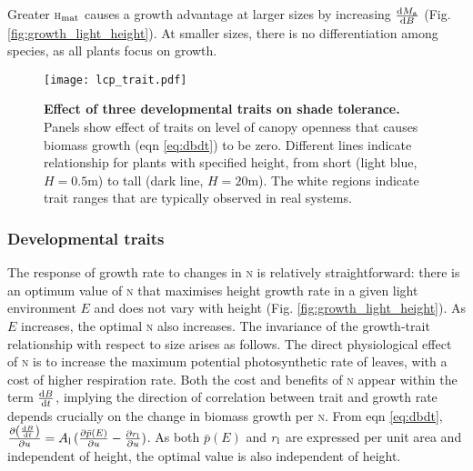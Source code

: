 \documentclass[9pt,twocolumn,twoside,lineno]{pnas-new}
\newcommand{\hmat}{\textsc{h}$_{\rm mat}$}
\newcommand{\nitrogen}{\textsc{n}}
\begin{document}
Greater {\hmat} causes a growth advantage at larger sizes by increasing $\frac{{\rm d}M_{\rm a}}{{\rm d}B}$ (Fig. \ref{fig:growth_light_height}). At smaller sizes, there is no differentiation among species, as all plants focus on growth.

\begin{SCfigure*}[\sidecaptionrelwidth][b]
\centering
\texttt{[image: lcp\_trait.pdf]}
\caption{\textbf{Effect of three developmental traits on shade tolerance.}
Panels show effect of traits on level of canopy openness that causes biomass growth (eqn \ref{eq:dbdt}) to be zero. Different lines indicate relationship for plants with specified height, from short (light blue,  $H=0.5$m) to tall (dark line, $H=20$m). The white regions indicate trait ranges that are typically observed in real systems.
\label{fig:wplcp}}
\end{SCfigure*}

\subsubsection*{Developmental traits}  The response of growth rate to changes in {\nitrogen} is relatively straightforward: there is an optimum value of {\nitrogen} that maximises height growth rate in a given light environment $E$ and does not vary with height (Fig. \ref{fig:growth_light_height}). As $E$ increases, the optimal {\nitrogen} also increases. The invariance of the growth-trait relationship with respect to size arises as follows. The direct physiological effect of {\nitrogen} is to increase the maximum potential photosynthetic rate of leaves, with a cost of higher respiration rate. Both the cost and benefits of {\nitrogen} appear within the term $\frac{ {\rm d}B}{{\rm d}t}$, implying the direction of correlation between trait and growth rate depends crucially on the change in biomass growth per {\nitrogen}.
From eqn \ref{eq:dbdt}, $\frac{\partial \left( \frac{ {\rm d}B} {{\rm d}t}\right)}{\partial
u} = A_{\rm l} \, (\frac{ \partial \bar{p}(E)}{\partial
u}  - \frac{ \partial r_{\rm l}}{\partial
u} )$. As both $\bar{p}(E)$ and $r_{\rm l}$ are expressed per unit area and independent of height, the optimal value is also independent of height.
\end{document}
